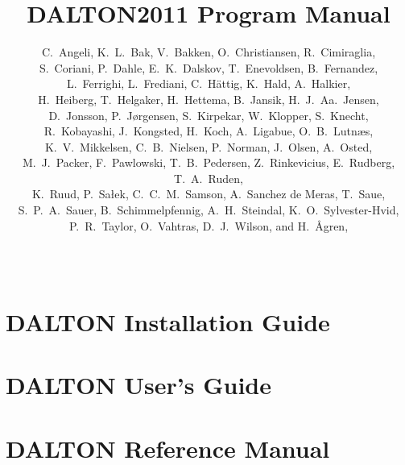\documentclass[11pt]{report}
\begin{document}
\nobibliography*
%
%
\baselineskip=15pt
%
\title{DALTON2011 Program Manual}

%
\author{C.~Angeli,
K.~L.~Bak,
V.~Bakken,
O.~Christiansen,
R.~Cimiraglia,\\
S.~Coriani,
P.~Dahle,
E.~K.~Dalskov,
T.~Enevoldsen,
B.~Fernandez,\\
L.~Ferrighi,
L.~Frediani,
C.~H{\"a}ttig,
K.~Hald,
A.~Halkier, \\
H.~Heiberg,
T.~Helgaker,
H.~Hettema,
B.~Jansik,
H.~J.~Aa.~Jensen, \\
D.~Jonsson,
P.~J{\o}rgensen,
S.~Kirpekar,
W.~Klopper,
S.~Knecht,\\
R.~Kobayashi,
J.~Kongsted,
H.~Koch,
A.~Ligabue,
O.~B.~Lutn\ae s,\\
K.~V.~Mikkelsen,
C.~B.~Nielsen,
P.~Norman,
J.~Olsen,
A.~Osted,\\
M.~J.~Packer,
F.~Pawlowski,
T.~B.~Pedersen,
Z.~Rinkevicius,
E.~Rudberg,
T.~A.~Ruden,\\
K.~Ruud,
P.~Sa\l ek,
C.~C.~M.~Samson,
A.~Sanchez de Meras,
T.~Saue,\\
S.~P.~A.~Sauer,
B.~Schimmelpfennig,
A.~H.~Steindal,
K.~O.~Sylvester-Hvid,\\
P.~R.~Taylor,
O.~Vahtras,
D.~J.~Wilson,
and H.~{\AA}gren,
}
%
\date{\mbox{\ }}
%
\maketitle
%



\part{DALTON Installation Guide}


\part{DALTON User's Guide}


















\part{DALTON Reference Manual}






















%





\end{document}
